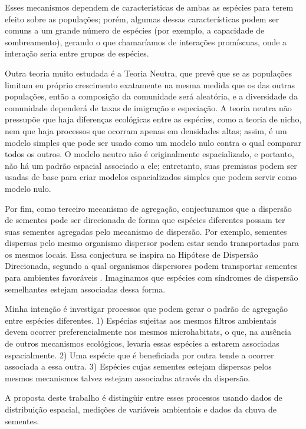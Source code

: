 \documentclass[twoside,12pt,a4paper]{report}
\begin{document}
Esses
mecanismos dependem de características de ambas as espécies para terem efeito sobre as populações;
porém, algumas dessas características podem ser comuns a um grande número de espécies (por exemplo,
a capacidade de sombreamento), gerando o que chamaríamos de interações promíscuas, onde a interação
seria entre grupos de espécies.


Outra teoria muito estudada é a Teoria Neutra, que prevê que se as populações limitam eu
próprio crescimento exatamente na mesma medida que os das outras populações, então a
composição da comunidade será aleatória, e a diversidade da comunidade dependerá de taxas de
imigração e especiação. A teoria neutra não pressupõe que haja diferenças ecológicas entre
as espécies, como a teoria de nicho, nem que haja processos que ocorram apenas em densidades
altas; assim, é um modelo simples que pode ser usado como um modelo nulo contra o qual comparar
todos os outros. O modelo neutro não é originalmente espacializado, e portanto, não há
um padrão espacial associado a ele; entretanto, suas premissas podem ser usadas de base para
criar modelos espacializados simples que podem servir como modelo nulo.

Por fim, como terceiro mecanismo de agregação, conjecturamos que a dispersão de sementes pode ser
direcionada de forma que espécies diferentes possam ter suas sementes agregadas pelo mecanismo de
dispersão. Por exemplo, sementes dispersas pelo mesmo organismo dispersor podem estar sendo
transportadas para os mesmos locais. Essa conjectura se inspira na Hipótese de Dispersão
Direcionada, segundo a qual organismos dispersores podem transportar sementes para ambientes
favoráveis \citep{Wenny2001, TODO,morerefs}. Imaginamos que espécies com síndromes de dispersão
semelhantes estejam associadas dessa forma.

Minha intenção é investigar processos que podem gerar o padrão de agregação entre espécies
diferentes. 1) Espécias sujeitas aos mesmos filtros ambientais devem ocorrer preferencialmente
nos mesmos microhabitats, o que, na ausência de outros mecanismos ecológicos, levaria essas
espécies a estarem associadas espacialmente. 2) Uma espécie que é beneficiada por outra tende a
ocorrer associada a essa outra. 3) Espécies cujas sementes estejam dispersas pelos mesmos
mecanismos talvez estejam associadas através da dispersão.

A proposta deste trabalho é distingüir entre esses processos usando dados de distribuição espacial, medições de variáveis ambientais e dados da chuva de sementes.
\end{document}
